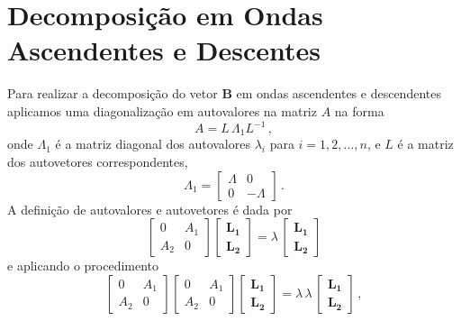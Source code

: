 \section{Decomposi\c{c}\~ao em Ondas Ascendentes e Descentes}

Para realizar a decomposi\c{c}\~ao do vetor $\mathbf{B}$ em ondas ascendentes e descendentes aplicamos uma diagonaliza\c{c}\~ao em autovalores na matriz $A$ na forma
\begin{equation}\label{eq.diagonalizacao}
A=L\,\Lambda_1L^{-1}\,,
\end{equation}
onde $\Lambda_1$ \'e a matriz diagonal dos autovalores $\lambda_i$ para $i=1,2,...,n$, e $L$ \'e a matriz dos autovetores correspondentes,
\begin{equation}\label{eq.Lambda_1}
\Lambda_1=
\begin{bmatrix}
\Lambda&0\\
0&-\Lambda
\end{bmatrix}\,.
\end{equation} 
A defini\c{c}\~ao de autovalores e autovetores \'e dada por
\begin{equation}\label{eq.sist_autovalores}
\begin{bmatrix}
0&A_1\\
A_2&0
\end{bmatrix}
\begin{bmatrix}
\mathbf{L_1}\\
\mathbf{L_2}
\end{bmatrix}
=
\lambda\,
\begin{bmatrix}
\mathbf{L_1}\\
\mathbf{L_2}
\end{bmatrix}
\end{equation}
e aplicando o procedimento
\begin{equation*}
\begin{bmatrix}
0&A_1\\
A_2&0
\end{bmatrix}
\begin{bmatrix}
0&A_1\\
A_2&0
\end{bmatrix}
\begin{bmatrix}
\mathbf{L_1}\\
\mathbf{L_2}
\end{bmatrix}
=
\lambda\,\lambda\,
\begin{bmatrix}
\mathbf{L_1}\\
\mathbf{L_2}
\end{bmatrix}\,,
\end{equation*}
